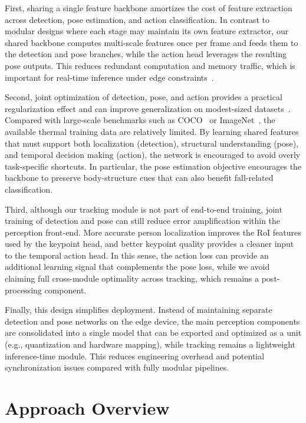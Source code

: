 First, sharing a single feature backbone amortizes the cost of feature extraction across detection, pose estimation, and action classification. In contrast to modular designs where each stage may maintain its own feature extractor, our shared backbone computes multi-scale features once per frame and feeds them to the detection and pose branches, while the action head leverages the resulting pose outputs. This reduces redundant computation and memory traffic, which is important for real-time inference under edge constraints~\cite{caruana1997multitask}.

Second, joint optimization of detection, pose, and action provides a practical regularization effect and can improve generalization on modest-sized datasets~\cite{ruder2017overview}. Compared with large-scale benchmarks such as COCO~\cite{lin2014microsoft} or ImageNet~\cite{deng2009imagenet}, the available thermal training data are relatively limited. By learning shared features that must support both localization (detection), structural understanding (pose), and temporal decision making (action), the network is encouraged to avoid overly task-specific shortcuts. In particular, the pose estimation objective encourages the backbone to preserve body-structure cues that can also benefit fall-related classification.

Third, although our tracking module is not part of end-to-end training, joint training of detection and pose can still reduce error amplification within the perception front-end. More accurate person localization improves the RoI features used by the keypoint head, and better keypoint quality provides a cleaner input to the temporal action head. In this sense, the action loss can provide an additional learning signal that complements the pose loss, while we avoid claiming full cross-module optimality across tracking, which remains a post-processing component.

Finally, this design simplifies deployment. Instead of maintaining separate detection and pose networks on the edge device, the main perception components are consolidated into a single model that can be exported and optimized as a unit (e.g., quantization and hardware mapping), while tracking remains a lightweight inference-time module. This reduces engineering overhead and potential synchronization issues compared with fully modular pipelines.

\section{Approach Overview}
\label{sec:intro_approach}

